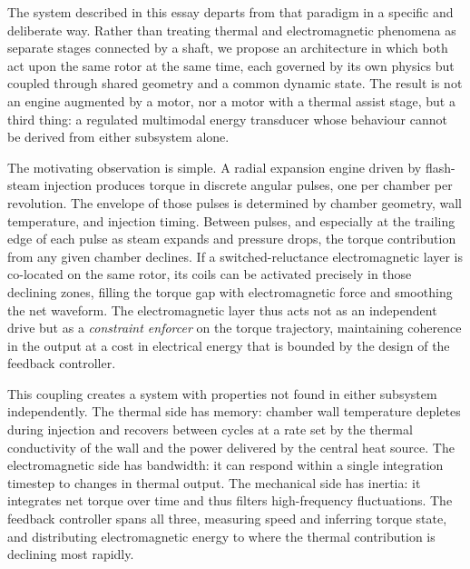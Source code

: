 \documentclass[11pt, a4paper]{article}
\theoremstyle{plain}
\theoremstyle{definition}
\begin{document}
The system described in this essay departs from that paradigm in a specific and deliberate way. Rather than treating thermal and electromagnetic phenomena as separate stages connected by a shaft, we propose an architecture in which both act upon the same rotor at the same time, each governed by its own physics but coupled through shared geometry and a common dynamic state. The result is not an engine augmented by a motor, nor a motor with a thermal assist stage, but a third thing: a regulated multimodal energy transducer whose behaviour cannot be derived from either subsystem alone.

The motivating observation is simple. A radial expansion engine driven by flash-steam injection produces torque in discrete angular pulses, one per chamber per revolution. The envelope of those pulses is determined by chamber geometry, wall temperature, and injection timing. Between pulses, and especially at the trailing edge of each pulse as steam expands and pressure drops, the torque contribution from any given chamber declines. If a switched-reluctance electromagnetic layer is co-located on the same rotor, its coils can be activated precisely in those declining zones, filling the torque gap with electromagnetic force and smoothing the net waveform. The electromagnetic layer thus acts not as an independent drive but as a \textit{constraint enforcer} on the torque trajectory, maintaining coherence in the output at a cost in electrical energy that is bounded by the design of the feedback controller.

This coupling creates a system with properties not found in either subsystem independently. The thermal side has memory: chamber wall temperature depletes during injection and recovers between cycles at a rate set by the thermal conductivity of the wall and the power delivered by the central heat source. The electromagnetic side has bandwidth: it can respond within a single integration timestep to changes in thermal output. The mechanical side has inertia: it integrates net torque over time and thus filters high-frequency fluctuations. The feedback controller spans all three, measuring speed and inferring torque state, and distributing electromagnetic energy to where the thermal contribution is declining most rapidly.
\end{document}
